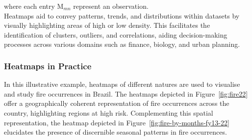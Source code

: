 \documentclass{article}\usepackage[]{graphicx}\usepackage[]{xcolor}
\numberwithin{equation}{section}
\begin{document}
\noindent
where each entry $\mathrm{M}_{mn}$ represent an observation.\\

\noindent Heatmaps aid to convey patterns, trends, and distributions within datasets by visually highlighting areas of high or low density. This facilitates the identification of clusters, outliers, and correlations, aiding decision-making processes across various domains such as finance, biology, and urban planning. 

\subsubsection{Heatmaps in Practice}
\noindent
In this illustrative example, heatmaps of different natures are used to visualise and study fire occurrences in Brazil. The heatmaps depicted in Figure~\ref{fig:fire22} offer a geographically coherent representation of fire occurrences across the country, highlighting regions at high risk. Complementing this spatial representation, the heatmap depicted in Figure~\ref{fig:fire-by-months-fy13-22} elucidates the presence of discernible seasonal patterns in fire occurrences.\\
\end{document}
